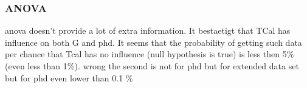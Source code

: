 \subsubsection{ANOVA}\label{sec:res-anova}
\Gls{anova} doesn't provide a lot of extra information. 
It bestaetigt that TCal has influence on both G and phd. 
It seems that the probability of getting such data per chance that Tcal has no influence 
(null hypothesis is true) is less then 5\% (even less than 1\%). 
wrong the second is not for phd but for extended data set
but for phd even lower than 0.1 \%

\iffalse
\subsubsection{Grid Search}
For \gls{krr} and {svm} I had to find out what the ideal hyper parameters were. 
So, I anstellen a grid search with the following hyperparameters: 
Now what are C,epsilon and gamma? 

Since the data set was very small, I could be generous with the grid search even on relatively humble hardware (intel i7-8550U). 

\subsubsection{KRR}
\subsubsection{SVM}
\td{plot the predicted data for variables which should be excluded (Tcal, Vcal,Conc, layers)}
\fi
